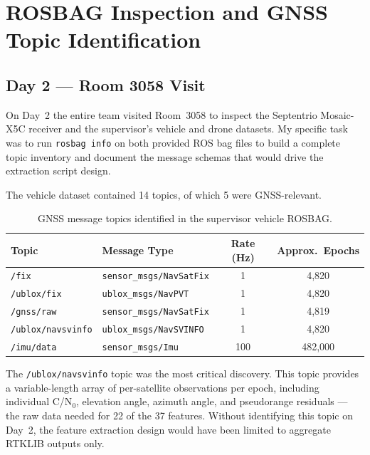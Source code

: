 \documentclass[12pt,a4paper]{article}
\newcommand{\code}[1]{\texttt{#1}}
\begin{document}
\section{ROSBAG Inspection and GNSS Topic Identification}

\subsection{Day 2 --- Room 3058 Visit}

On Day~2 the entire team visited Room~3058 to inspect the Septentrio Mosaic-X5C receiver
and the supervisor's vehicle and drone datasets.
My specific task was to run \code{rosbag info} on both provided ROS bag files to build a
complete topic inventory and document the message schemas that would drive the extraction
script design.

The vehicle dataset contained 14 topics, of which 5 were GNSS-relevant.

\begin{table}[H]
  \centering
  \caption{GNSS message topics identified in the supervisor vehicle ROSBAG.}
  \begin{tabular}{llcc}
    \toprule
    \textbf{Topic} & \textbf{Message Type} & \textbf{Rate (Hz)} & \textbf{Approx.\ Epochs} \\
    \midrule
    \code{/fix}                & \code{sensor\_msgs/NavSatFix}  & 1   & 4,820 \\
    \code{/ublox/fix}          & \code{ublox\_msgs/NavPVT}      & 1   & 4,820 \\
    \code{/gnss/raw}           & \code{sensor\_msgs/NavSatFix}  & 1   & 4,819 \\
    \code{/ublox/navsvinfo}    & \code{ublox\_msgs/NavSVINFO}   & 1   & 4,820 \\
    \code{/imu/data}           & \code{sensor\_msgs/Imu}        & 100 & 482,000 \\
    \bottomrule
  \end{tabular}
\end{table}

The \code{/ublox/navsvinfo} topic was the most critical discovery.
This topic provides a variable-length array of per-satellite observations per epoch,
including individual C/N$_0$, elevation angle, azimuth angle, and pseudorange residuals
--- the raw data needed for 22 of the 37 features.
Without identifying this topic on Day~2, the feature extraction design would have been
limited to aggregate RTKLIB outputs only.
\end{document}
